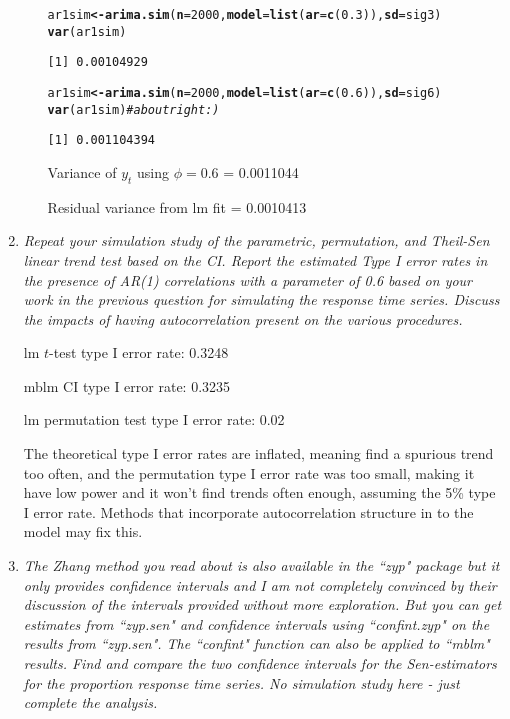 \documentclass[11pt]{article}\usepackage[]{graphicx}\usepackage[]{color}
\makeatletter
\newcommand{\hlnum}[1]{\textcolor[rgb]{0,0,0}{#1}}%
\newcommand{\hlcom}[1]{\textcolor[rgb]{0.4,0.4,0.4}{\textit{#1}}}%
\newcommand{\hlstd}[1]{\textcolor[rgb]{0,0,0}{#1}}%
\newcommand{\hlkwb}[1]{\textcolor[rgb]{0,0,0}{\textbf{#1}}}%
\newcommand{\hlkwc}[1]{\textcolor[rgb]{0,0,0}{\textbf{#1}}}%
\newcommand{\hlkwd}[1]{\textcolor[rgb]{0,0,0}{\textbf{#1}}}%
\newenvironment{kframe}{%
 \def\at@end@of@kframe{}%
 \ifinner\ifhmode%
  \def\at@end@of@kframe{\end{minipage}}%
  \begin{minipage}{\columnwidth}%
 \fi\fi%
 \def\FrameCommand##1{\hskip\@totalleftmargin \hskip-\fboxsep
 \colorbox{shadecolor}{##1}\hskip-\fboxsep
     \hskip-\linewidth \hskip-\@totalleftmargin \hskip\columnwidth}%
 \MakeFramed {\advance\hsize-\width
   \@totalleftmargin\z@ \linewidth\hsize
   \@setminipage}}%
 {\par\unskip\endMakeFramed%
 \at@end@of@kframe}
\newenvironment{knitrout}{}{} %
\makeatother
\begin{document}
\begin{enumerate}
\begin{enumerate}
\begin{knitrout}
\begin{kframe}
\begin{alltt}
\hlstd{ar1sim}\hlkwb{<-}\hlkwd{arima.sim}\hlstd{(}\hlkwc{n}\hlstd{=}\hlnum{2000}\hlstd{,}\hlkwc{model}\hlstd{=}\hlkwd{list}\hlstd{(}\hlkwc{ar}\hlstd{=}\hlkwd{c}\hlstd{(}\hlnum{0.3}\hlstd{)),}\hlkwc{sd}\hlstd{=sig3)}
\hlkwd{var}\hlstd{(ar1sim)}
\end{alltt}
\begin{verbatim}
[1] 0.00104929
\end{verbatim}
\begin{alltt}
\hlstd{ar1sim}\hlkwb{<-}\hlkwd{arima.sim}\hlstd{(}\hlkwc{n}\hlstd{=}\hlnum{2000}\hlstd{,}\hlkwc{model}\hlstd{=}\hlkwd{list}\hlstd{(}\hlkwc{ar}\hlstd{=}\hlkwd{c}\hlstd{(}\hlnum{0.6}\hlstd{)),}\hlkwc{sd}\hlstd{=sig6)}
\hlkwd{var}\hlstd{(ar1sim)} \hlcom{# about right :)}
\end{alltt}
\begin{verbatim}
[1] 0.001104394
\end{verbatim}
\end{kframe}
\end{knitrout}

Variance of $y_t$ using $\phi=0.6$ = 0.0011044

Residual variance from lm fit = 0.0010413

\end{enumerate}

\item%
{\it Repeat your simulation study of the parametric, permutation, and Theil-Sen linear trend test based on the CI. Report the estimated Type I error rates in the presence of AR(1) correlations with a parameter of 0.6 based on your work in the previous question for simulating the response time series. Discuss the impacts of having autocorrelation present on the various procedures.}



lm $t$-test type I error rate: 0.3248

mblm CI type I error rate: 0.3235

lm permutation test type I error rate: 0.02

The theoretical type I error rates are inflated, meaning find a spurious trend too often, and the permutation type I error rate was too small, making it have low power and it won't find trends often enough, assuming the 5\% type I error rate. Methods that incorporate autocorrelation structure in to the model may fix this.

\item%
{\it The Zhang method you read about is also available in the ``zyp" package but it only provides confidence intervals and I am not completely convinced by their discussion of the intervals provided without more exploration. But you can get estimates from ``zyp.sen" and confidence intervals using ``confint.zyp" on the results from ``zyp.sen". The ``confint" function can also be applied to ``mblm" results. Find and compare the two confidence intervals for the Sen-estimators for the proportion response time series. No simulation study here - just complete the analysis.}






\end{enumerate}
\end{document}
